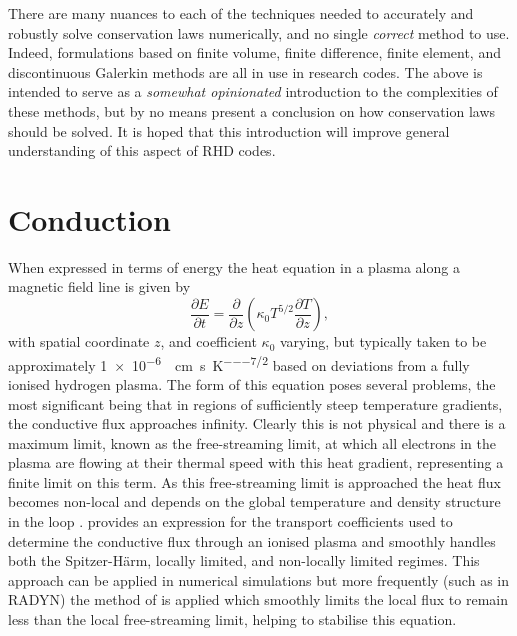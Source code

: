 There are many nuances to each of the techniques needed to accurately and robustly solve conservation laws numerically, and no single \emph{correct} method to use.
Indeed, formulations based on finite volume, finite difference, finite element, and discontinuous Galerkin methods are all in use in \Sota{} research codes.
The above is intended to serve as a \emph{somewhat opinionated} introduction to the complexities of these methods, but by no means present a conclusion on how conservation laws should be solved.
It is hoped that this introduction will improve general understanding of this aspect of RHD codes.

\section{Conduction}\label{Sec:NumericalConduction}

When expressed in terms of energy the heat equation in a plasma along a magnetic field line is given by
\begin{equation}
    \frac{\partial E}{\partial t} = \frac{\partial}{\partial z}\left( \kappa_0 T^{5/2} \frac{\partial T}{\partial z} \right),
\end{equation}
with spatial coordinate $z$, and coefficient $\kappa_0$ varying, but typically taken to be approximately \SI{1e-6}{\erg\per\centi\metre\per\second\per\kelvin\tothe{7/2}} \citep{Spitzer1953,Braginskii1965} based on deviations from a fully ionised hydrogen plasma.
The form of this equation poses several problems, the most significant being that in regions of sufficiently steep temperature gradients, the conductive flux approaches infinity.
Clearly this is not physical and there is a maximum limit, known as the free-streaming limit, at which all electrons in the plasma are flowing at their thermal speed with this heat gradient, representing a finite limit on this term.
As this free-streaming limit is approached the heat flux becomes non-local and depends on the global temperature and density structure in the loop \citep{Battaglia2009}.
\citet{Campbell1984} provides an expression for the transport coefficients used to determine the conductive flux through an ionised plasma and smoothly handles both the Spitzer-H\"{a}rm, locally limited, and non-locally limited regimes.
This approach can be applied in numerical simulations but more frequently (such as in RADYN) the method of \citet{FISHER1985} is applied which smoothly limits the local flux to remain less than the local free-streaming limit, helping to stabilise this equation.

